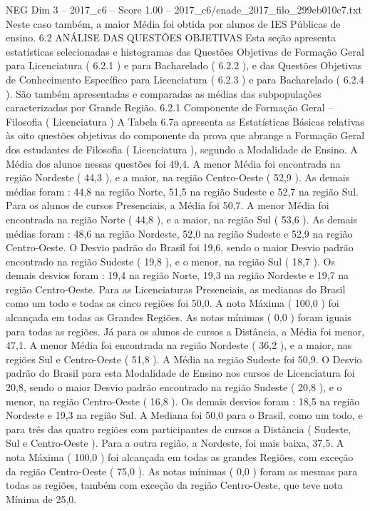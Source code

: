\begin{textsample}{NEG Dim 3 – 2017\_c6 – Score 1.00 – 2017\_c6/enade\_2017\_filo\_299cb010c7.txt}
Neste caso também, a maior Média foi obtida por alunos de IES Públicas de ensino. 6.2 ANÁLISE DAS QUESTÕES OBJETIVAS Esta seção apresenta estatísticas selecionadas e histogramas das Questões Objetivas de Formação Geral para Licenciatura ( 6.2.1 ) e para Bacharelado ( 6.2.2 ), e das Questões Objetivas de Conhecimento Específico para Licenciatura ( 6.2.3 ) e para Bacharelado ( 6.2.4 ).
São também apresentadas e comparadas as médias das subpopulações caracterizadas por Grande Região. 6.2.1 Componente de Formação Geral – Filosofia ( Licenciatura ) A Tabela 6.7a apresenta as Estatísticas Básicas relativas às oito questões objetivas do componente da prova que abrange a Formação Geral dos estudantes de Filosofia ( Licenciatura ), segundo a Modalidade de Ensino.
A Média dos alunos nessas questões foi 49,4.
A menor Média foi encontrada na região Nordeste ( 44,3 ), e a maior, na região Centro-Oeste ( 52,9 ).
As demais médias foram : 44,8 na região Norte, 51,5 na região Sudeste e 52,7 na região Sul.
Para os alunos de cursos Presenciais, a Média foi 50,7.
A menor Média foi encontrada na região Norte ( 44,8 ), e a maior, na região Sul ( 53,6 ).
As demais médias foram : 48,6 na região Nordeste, 52,0 na região Sudeste e 52,9 na região Centro-Oeste.
O Desvio padrão do Brasil foi 19,6, sendo o maior Desvio padrão encontrado na região Sudeste ( 19,8 ), e o menor, na região Sul ( 18,7 ).
Os demais desvios foram : 19,4 na região Norte, 19,3 na região Nordeste e 19,7 na região Centro-Oeste.
Para as Licenciaturas Presenciais, as medianas do Brasil como um todo e todas as cinco regiões foi 50,0.
A nota Máxima ( 100,0 ) foi alcançada em todas as Grandes Regiões.
As notas mínimas ( 0,0 ) foram iguais para todas as regiões.
Já para os alunos de cursos a Distância, a Média foi menor, 47,1.
A menor Média foi encontrada na região Nordeste ( 36,2 ), e a maior, nas regiões Sul e Centro-Oeste ( 51,8 ).
A Média na região Sudeste foi 50,9.
O Desvio padrão do Brasil para esta Modalidade de Ensino nos cursos de Licenciatura foi 20,8, sendo o maior Desvio padrão encontrado na região Sudeste ( 20,8 ), e o menor, na região Centro-Oeste ( 16,8 ).
Os demais desvios foram : 18,5 na região Nordeste e 19,3 na região Sul.
A Mediana foi 50,0 para o Brasil, como um todo, e para três das quatro regiões com participantes de cursos a Distância ( Sudeste, Sul e Centro-Oeste ).
Para a outra região, a Nordeste, foi mais baixa, 37,5.
A nota Máxima ( 100,0 ) foi alcançada em todas as grandes Regiões, com exceção da região Centro-Oeste ( 75,0 ).
As notas mínimas ( 0,0 ) foram as mesmas para todas as regiões, também com exceção da região Centro-Oeste, que teve nota Mínima de 25,0.

\end{textsample}
